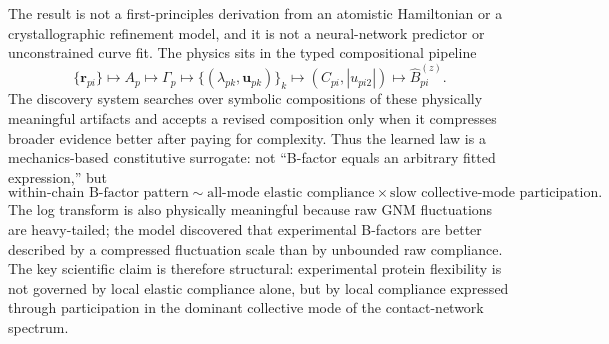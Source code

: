 \documentclass[11pt]{article}
\theoremstyle{definition}
\begin{document}
The result is not a first-principles derivation from an atomistic Hamiltonian or a crystallographic refinement model, and it is not a neural-network predictor or unconstrained curve fit. The physics sits in the typed compositional pipeline
\[
\{\mathbf r_{pi}\}\longmapsto A_p\longmapsto \Gamma_p
\longmapsto \{(\lambda_{pk},\mathbf u_{pk})\}_{k}
\longmapsto (C_{pi},|u_{pi2}|)
\longmapsto \widehat B^{(z)}_{pi}.
\]
The discovery system searches over symbolic compositions of these physically meaningful artifacts and accepts a revised composition only when it compresses broader evidence better after paying for complexity. Thus the learned law is a mechanics-based constitutive surrogate: not ``B-factor equals an arbitrary fitted expression,'' but
\[
\text{within-chain B-factor pattern}
\sim
\text{all-mode elastic compliance}
\times
\text{slow collective-mode participation}.
\]
The log transform is also physically meaningful because raw GNM fluctuations are heavy-tailed; the model discovered that experimental B-factors are better described by a compressed fluctuation scale than by unbounded raw compliance. The key scientific claim is therefore structural: experimental protein flexibility is not governed by local elastic compliance alone, but by local compliance expressed through participation in the dominant collective mode of the contact-network spectrum.
\end{document}
